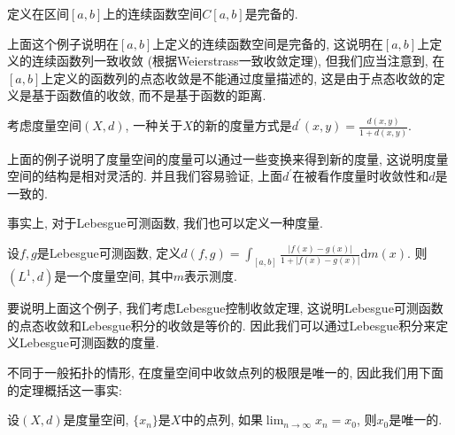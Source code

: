 \documentclass[theorem=false,mathfont=none,openany,sub3section]{easybook}
\begin{document}
\begin{example}
  定义在区间$[a,b]$上的连续函数空间$C[a,b]$是完备的.\par
\end{example}

\begin{remark}
  上面这个例子说明在$[a,b]$上定义的连续函数空间是完备的, 这说明在$[a,b]$上定义的连续函数列一致收敛 (根据Weierstrass一致收敛定理), 但我们应当注意到, 在$[a,b]$上定义的函数列的点态收敛是不能通过度量描述的, 这是由于点态收敛的定义是基于函数值的收敛, 而不是基于函数的距离.\par
\end{remark}

\begin{example}
  考虑度量空间$(X,d)$, 一种关于$X$的新的度量方式是$d^{\prime}(x,y)=\frac{d(x,y)}{1+d(x,y)}$.\par
\end{example}

\begin{remark}
  上面的例子说明了度量空间的度量可以通过一些变换来得到新的度量, 这说明度量空间的结构是相对灵活的. 并且我们容易验证, 上面$d^{\prime}$在被看作度量时收敛性和$d$是一致的.\par
\end{remark}

事实上, 对于Lebesgue可测函数, 我们也可以定义一种度量.\par

\begin{example}
  设$f,g$是Lebesgue可测函数, 定义$d(f,g) = \int_{[a,b]}^{} \frac{|f(x) - g(x)|}{1+|f(x) - g(x)|} \mathrm{d}m(x)$. 则$(L^1, d)$是一个度量空间, 其中$m$表示测度.\par
\end{example}

\begin{remark}
  要说明上面这个例子, 我们考虑Lebesgue控制收敛定理, 这说明Lebesgue可测函数的点态收敛和Lebesgue积分的收敛是等价的. 因此我们可以通过Lebesgue积分来定义Lebesgue可测函数的度量.\par
\end{remark}

不同于一般拓扑的情形, 在度量空间中收敛点列的极限是唯一的, 因此我们用下面的定理概括这一事实:\par

\begin{theorem}
  设$(X,d)$是度量空间, $\{x_n\}$是$X$中的点列, 如果$\lim_{n \to \infty} x_n = x_0$, 则$x_0$是唯一的.\par
\end{theorem}
\end{document}

